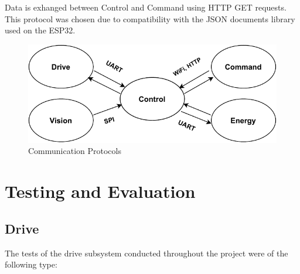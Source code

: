\documentclass[10pt,twoside]{article}
\begin{document}
Data is exhanged between Control and Command using HTTP GET requests. This protocol was chosen due to compatibility with the JSON documents library used on the ESP32.

\begin{figure}[hbt!]
    \centering
    \includegraphics[scale=0.60]{Communication_protocols.pdf}
    \captionsetup{justification=centering}
    \caption{Communication Protocols}
\end{figure}

\newpage


\section{Testing and Evaluation}


\subsection{Drive}

The tests of the drive subsystem conducted throughout the project were of the following type:
\end{document}
